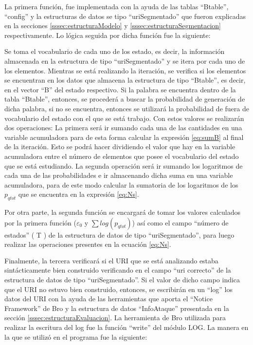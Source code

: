 La primera función, fue implementada con la ayuda de las tablas “Btable”, “config” y la estructuras de datos se tipo “uriSegmentado” que fueron explicadas en la secciones \ref{sssec:estructuraModelo} y \ref{sssec:estructuraSegmentacion} respectivamente.  Lo lógica seguida por dicha función fue la siguiente:

Se toma el vocabulario de cada uno de los estado, es decir, la información almacenada en la estructura de tipo “uriSegmentado” y se itera por cada uno de los elementos. Mientras se está realizando la iteración, se verifica si los elementos se encuentran en los datos que almacena la estructura de tipo “Btable”, es decir, en el vector “B” del estado respectivo. Si la palabra se encuentra dentro de la tabla “Btable”, entonces, se procederá a buscar la probabilidad de generación de dicha palabra, si no se encuentra, entonces se utilizará la probabilidad de fuera de vocabulario del estado con el que se está trabajo. Con estos valores se realizarán dos operaciones: La primera será ir sumando cada una de las cantidades en una variable acumuladora para de esta forma calcular  la expresión \ref{eq:sumB} al final de la iteración. Esto se podrá hacer dividiendo el valor que hay en la variable acumuladora entre el número de elementos que posee el vocabulario del estado que se está estudiando. La segunda operación será ir sumando los logaritmos de cada una de las probabilidades e ir almacenando dicha suma en una variable acumuladora, para de este modo calcular la sumatoria de los logaritmos de los $p_{qtot}$ que se encuentra en la expresión \ref{eq:Ns}.

Por otra parte, la segunda función se encargará de tomar los valores calculados por la primera función ($\varepsilon_{0}$ y $\sum log(p_{qtot})$)  así como el campo “número de estados” ( T ) de la estructura de datos de tipo “uriSegmentado”, para luego realizar las operaciones presentes en la ecuación \ref{eq:Ns}.

Finalmente, la tercera verificará si el URI que se está analizando estaba sintácticamente bien construido verificando en el campo “uri correcto” de la estructura de datos de tipo “uriSegmentado”. Si el valor de dicho campo indica que el URI no estuvo bien construido, entonces, se escribirán en un “log”  los datos del URI  con la ayuda de las herramientas que aporta el “Notice Framework” de Bro y la estructura de datos “InfoAtaque” presentada en la sección \ref{sssec:estructuraEvaluacion}. La herramienta de Bro utilizada para realizar la escritura del log fue la función “write” del módulo LOG. La manera en la que se utilizó en el programa fue la siguiente:

